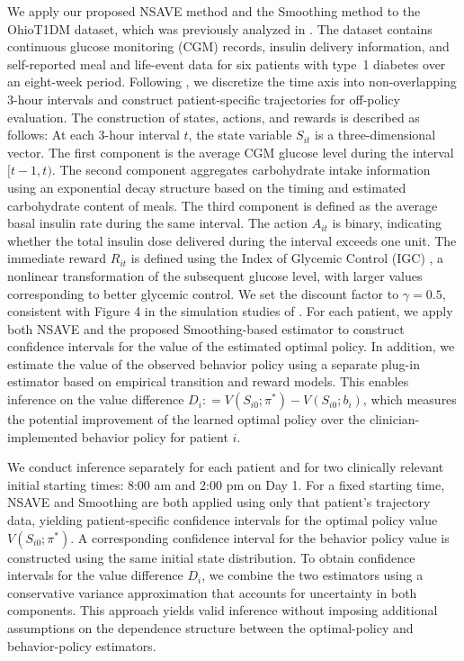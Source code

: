\documentclass[12pt]{article}
\theoremstyle{remark}\newtheorem{remark}[theorem]{Remark}\theoremstyle{plain}
\begin{document}
We apply our proposed NSAVE method and the Smoothing method to the OhioT1DM dataset, which was previously analyzed in \citet{shi2022statistical}. 
The dataset contains continuous glucose monitoring (CGM) records, insulin delivery information, and self-reported meal and life-event data for six patients with type~1 diabetes over an eight-week period.
Following \citet{shi2022statistical}, we discretize the time axis into non-overlapping 3-hour intervals and construct patient-specific trajectories for off-policy evaluation.
The construction of states, actions, and rewards is described as follows:
At each 3-hour interval $t$, the state variable $S_{it}$ is a three-dimensional vector.
The first component is the average CGM glucose level during the interval $[t-1,t)$.
The second component aggregates carbohydrate intake information using an exponential decay structure based on the timing and estimated carbohydrate content of meals.
The third component is defined as the average basal insulin rate during the same interval.
The action $A_{it}$ is binary, indicating whether the total insulin dose delivered during the interval exceeds one unit.
The immediate reward $R_{it}$ is defined using the Index of Glycemic Control (IGC) \citep{rodbard2009interpretation}, a nonlinear transformation of the subsequent glucose level, with larger values corresponding to better glycemic control.
We set the discount factor to $\gamma=0.5$, consistent with Figure 4 in the simulation studies of \cite{shi2022statistical}. For each patient, we apply both NSAVE and the proposed Smoothing-based estimator to construct confidence intervals for the value of the estimated optimal policy.
In addition, we estimate the value of the observed behavior policy using a separate plug-in estimator based on empirical transition and reward models.
This enables inference on the value difference $D_i: = V(S_{i0}; \pi^*) - V(S_{i0}; b_i)$,
which measures the potential improvement of the learned optimal policy over the clinician-implemented behavior policy for patient $i$.

We conduct inference separately for each patient and for two clinically relevant initial starting times: 8:00 am and 2:00 pm on Day 1.
For a fixed starting time, NSAVE and Smoothing are both applied using only that patient's trajectory data, yielding patient-specific confidence intervals for the optimal policy value $V(S_{i0};\pi^*)$.
A corresponding confidence interval for the behavior policy value is constructed using the same initial state distribution.
To obtain confidence intervals for the value difference $D_i$, we combine the two estimators using a conservative variance approximation that accounts for uncertainty in both components.
This approach yields valid inference without imposing additional assumptions on the dependence structure between the optimal-policy and behavior-policy estimators.
\end{document}
